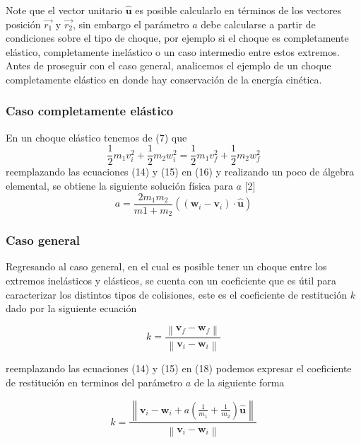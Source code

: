 \documentclass{article}
\newcommand{\norm}[1]{\left\lVert#1\right\rVert}
\begin{document}
Note que el vector unitario $\hat{\textbf{u}}$ es posible calcularlo en términos de los vectores posición $\vec{r_1}$ y $\vec{r_2}$, sin embargo el parámetro $a$ debe calcularse a partir de condiciones sobre el tipo de choque, por ejemplo si el choque es completamente elástico, completamente inelástico o un caso intermedio entre estos extremos. Antes de proseguir con el caso general, analicemos el ejemplo de un choque completamente elástico en donde hay conservación de la energía cinética.
\subsubsection{Caso completamente elástico}

En un choque elástico tenemos de (7) que
\begin{equation}
    \frac{1}{2} m_1 v_i^2+   \frac{1}{2} m_2 w_i^2 =  \frac{1}{2} m_1 v_f^2+  \frac{1}{2} m_2 w_f^2
\end{equation}
 reemplazando las ecuaciones (14) y (15) en (16) y realizando un poco de álgebra elemental, se obtiene la siguiente solución física para $a$ [2]
 \begin{equation}
     a= \frac{2m_1m_2}{m1+m_2}((\textbf{w}_{i}-\textbf{v}_{i})\cdot \hat{\textbf{u}})
 \end{equation}


\subsubsection{Caso general}
Regresando al caso general, en el cual es posible tener un choque entre los extremos inelásticos y elásticos, se cuenta con un coeficiente que es útil para caracterizar los distintos tipos de colisiones, este es el coeficiente de restitución $k$ dado por la siguiente ecuación

\begin{equation}
    k=\frac{\norm{\textbf{v}_{f}-\textbf{w}_{f}}}{\norm{\textbf{v}_{i}-\textbf{w}_{i}}}
\end{equation}

reemplazando las ecuaciones (14) y (15) en (18) podemos expresar el coeficiente de restitución en terminos del parámetro $a$ de la siguiente forma

\begin{equation}
    k=\frac{\norm{\textbf{v}_{i}-\textbf{w}_{i}+a(\frac{1}{m_1}+\frac{1}{m_2})\hat{\textbf{u}}}}{\norm{\textbf{v}_{i}-\textbf{w}_{i}}}
\end{equation}
\end{document}
